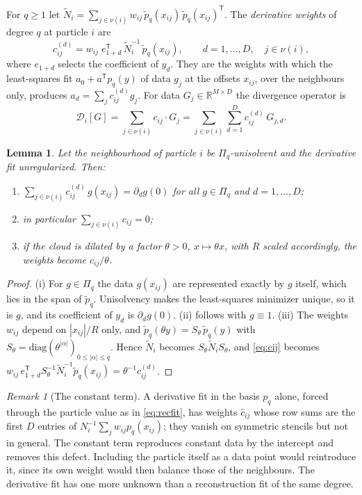\documentclass[11pt,a4paper]{article}
\theoremstyle{plain}
\newtheorem{lemma}[theorem]{Lemma}
\theoremstyle{definition}
\theoremstyle{remark}
\newtheorem{remark}[theorem]{Remark}
\numberwithin{equation}{section}
\newcommand{\R}{\mathbb{R}}
\newcommand{\nb}{\nu}
\newcommand{\Dop}{\mathcal{D}}
\newcommand{\ptil}{\tilde p}
\newcommand{\Ntil}{\tilde N}
\begin{document}
For $q\ge1$ let $\Ntil_i=\sum_{j\in\nb(i)} w_{ij}\,\ptil_q(x_{ij})\,\ptil_q(x_{ij})^{\mathsf T}$. The \emph{derivative weights} of degree $q$ at particle $i$ are
\begin{equation}\label{eq:cij}
c^{(d)}_{ij} = w_{ij}\; e_{1+d}^{\mathsf T}\,\Ntil_i^{-1}\,\ptil_q(x_{ij}),\qquad d=1,\dots,D,\quad j\in\nb(i),
\end{equation}
where $e_{1+d}$ selects the coefficient of $y_d$. They are the weights with which the least-squares fit $a_0+a^{\mathsf T}p_q(y)$ of data $g_j$ at the offsets $x_{ij}$, over the neighbours only, produces $a_d=\sum_j c^{(d)}_{ij}g_j$. For data $G_j\in\R^{M\times D}$ the divergence operator is
\begin{equation}\label{eq:divop}
\Dop_i[G] = \sum_{j\in\nb(i)} c_{ij}\cdot G_j = \sum_{j\in\nb(i)}\sum_{d=1}^D c^{(d)}_{ij}\,G_{j,d}.
\end{equation}

\begin{lemma}\label{lem:divfit}
Let the neighbourhood of particle $i$ be $\Pi_q$-unisolvent and the derivative fit unregularized. Then:
\begin{enumerate}[label=(\roman*)]
\item $\sum_{j\in\nb(i)} c^{(d)}_{ij}\,g(x_{ij}) = \partial_d g(0)$ for all $g\in\Pi_q$ and $d=1,\dots,D$;
\item in particular $\sum_{j\in\nb(i)} c_{ij}=0$;
\item if the cloud is dilated by a factor $\theta>0$, $x\mapsto\theta x$, with $R$ scaled accordingly, the weights become $c_{ij}/\theta$.
\end{enumerate}
\end{lemma}

\begin{proof}
(i) For $g\in\Pi_q$ the data $g(x_{ij})$ are represented exactly by $g$ itself, which lies in the span of $\ptil_q$. Unisolvency makes the least-squares minimizer unique, so it is $g$, and its coefficient of $y_d$ is $\partial_d g(0)$. (ii) follows with $g\equiv1$. (iii) The weights $w_{ij}$ depend on $|x_{ij}|/R$ only, and $\ptil_q(\theta y)=S_\theta\,\ptil_q(y)$ with $S_\theta=\mathrm{diag}(\theta^{|\alpha|})_{0\le|\alpha|\le q}$. Hence $\Ntil_i$ becomes $S_\theta\Ntil_iS_\theta$, and \eqref{eq:cij} becomes $w_{ij}\,e_{1+d}^{\mathsf T}S_\theta^{-1}\Ntil_i^{-1}\ptil_q(x_{ij})=\theta^{-1}c^{(d)}_{ij}$.
\end{proof}

\begin{remark}[The constant term]\label{rem:constant}
A derivative fit in the basis $p_q$ alone, forced through the particle value as in \eqref{eq:recfit}, has weights $\hat c_{ij}$ whose row sums are the first $D$ entries of $N_i^{-1}\sum_j w_{ij}p_q(x_{ij})$; they vanish on symmetric stencils but not in general. The constant term reproduces constant data by the intercept and removes this defect. Including the particle itself as a data point would reintroduce it, since its own weight would then balance those of the neighbours. The derivative fit has one more unknown than a reconstruction fit of the same degree.
\end{remark}
\end{document}
